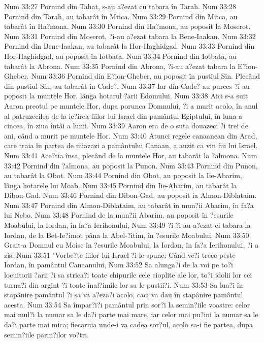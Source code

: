 Num 33:27  Pornind din Tahat, s-au a?ezat cu tabara în Tarah.
Num 33:28  Pornind din Tarah, au tabarât în Mitca.
Num 33:29  Pornind din Mitca, au tabarât în Ha?mona.
Num 33:30  Pornind din Ha?mona, au poposit la Moserot.
Num 33:31  Pornind din Moserot, ?i-au a?ezat tabara la Bene-Iaakan.
Num 33:32  Pornind din Bene-Iaakan, au tabarât la Hor-Haghidgad.
Num 33:33  Pornind din Hor-Haghidgad, au poposit în Iotbata.
Num 33:34  Pornind din Iotbata, au tabarât la Abrona.
Num 33:35  Pornind din Abrona, ?i-au a?ezat tabara la E?ion-Gheber.
Num 33:36  Pornind din E?ion-Gheber, au poposit în pustiul Sin. Plecând din pustiul Sin, au tabarât în Cade?.
Num 33:37  Iar din Cade? au purces ?i au poposit la muntele Hor, lânga hotarul ?arii Edomului.
Num 33:38  Aici s-a suit Aaron preotul pe muntele Hor, dupa porunca Domnului, ?i a murit acolo, în anul al patruzecilea de la ie?irea fiilor lui Israel din pamântul Egiptului, în luna a cincea, în ziua întâi a lunii.
Num 33:39  Aaron era de o suta douazeci ?i trei de ani, când a murit pe muntele Hor.
Num 33:40  Atunci regele canaanean din Arad, care traia în partea de miazazi a pamântului Canaan, a auzit ca vin fiii lui Israel.
Num 33:41  Ace?tia însa, plecând de la muntele Hor, au tabarât la ?almona.
Num 33:42  Pornind din ?almona, au poposit la Punon.
Num 33:43  Pornind din Punon, au tabarât la Obot.
Num 33:44  Pornind din Obot, au poposit la Iie-Abarim, lânga hotarele lui Moab.
Num 33:45  Pornind din Iie-Abarim, au tabarât la Dibon-Gad.
Num 33:46  Pornind din Dibon-Gad, au poposit ia Almon-Diblataim.
Num 33:47  Pornind din Almon-Diblataim, au tabarât în mun?ii Abarim, în fa?a lui Nebo.
Num 33:48  Pornind de la mun?ii Abarim, au poposit în ?esurile Moabului, la Iordan, în fa?a Ierihonului,
Num 33:49  ?i ?i-au a?ezat ei tabara la Iordan, de la Bet-Ie?imot pâna la Abel-?itim, în ?esurile Moabului.
Num 33:50  Grait-a Domnul cu Moise în ?esurile Moabului, la Iordan, în fa?a Ierihonului, ?i a zis:
Num 33:51  "Vorbe?te fiilor lui Israel ?i le spune: Când ve?i trece peste Iordan, în pamântul Canaanului,
Num 33:52  Sa alunga?i de la voi pe to?i locuitorii ?arii ?i sa strica?i toate chipurile cele cioplite ale lor, to?i idolii lor cei turna?i din argint ?i toate înal?imile lor sa le pustii?i.
Num 33:53  Sa lua?i în stapânire pamântul ?i sa va a?eza?i acolo, caci va dau în stapânire pamântul acesta.
Num 33:54  Sa împar?i?i pamântul prin sor?i la semin?iile voastre: celor mai mul?i la numar sa le da?i parte mai mare, iar celor mai pu?ini la numar sa le da?i parte mai mica; fiecaruia unde-i va cadea sor?ul, acolo sa-i fie partea, dupa semin?iile parin?ilor vo?tri.
